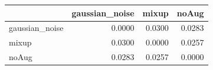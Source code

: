 \begin{tabular}{lrrr}
\toprule
 & gaussian_noise & mixup & noAug \\
\midrule
gaussian_noise & 0.0000 & 0.0300 & 0.0283 \\
mixup & 0.0300 & 0.0000 & 0.0257 \\
noAug & 0.0283 & 0.0257 & 0.0000 \\
\bottomrule
\end{tabular}
